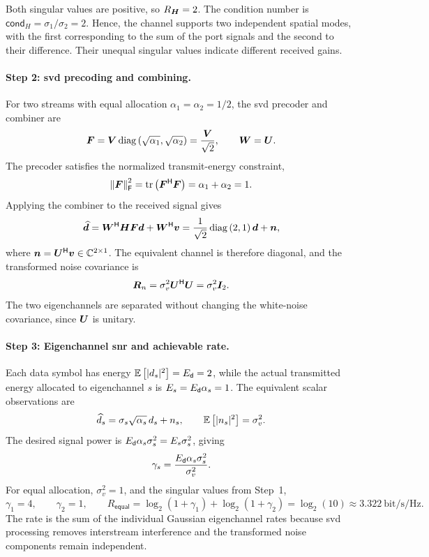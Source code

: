 Both singular values are positive, so $R_{\bm{H}}=2$. The condition number is $\mathsf{cond}_H=\sigma_1/\sigma_2=2$. Hence, the channel supports two independent spatial modes, with the first corresponding to the sum of the port signals and the second to their difference. Their unequal singular values indicate different received gains.

\paragraph{Step 2: \ac{svd} precoding and combining.}
For two streams with equal allocation $\alpha_1=\alpha_2=1/2$, the \ac{svd} precoder and combiner are
\begin{equation*}
	\bm{F}=\bm{V}\operatorname{diag}\left(\sqrt{\alpha_1},\sqrt{\alpha_2}\right)
	=\frac{\bm{V}}{\sqrt2},
	\qquad
	\bm{W}=\bm{U}.
\end{equation*}
The precoder satisfies the normalized transmit-energy constraint,
\begin{equation*}
	\left\|\bm{F}\right\|_{\mathsf{F}}^2
	=\operatorname{tr}\left({\bm{F}}^{\mathsf{H}}\bm{F}\right)
	=\alpha_1+\alpha_2=1.
\end{equation*}
Applying the combiner to the received signal gives
\begin{equation*}
	\widehat{\bm{d}}
	={\bm{W}}^{\mathsf{H}}\bm{H}\bm{F}\bm{d}+{\bm{W}}^{\mathsf{H}}\bm{v}
	=\frac1{\sqrt2}\operatorname{diag}\left(2,1\right)\bm{d}+\bm{n},
\end{equation*}
where $\bm{n}={\bm{U}}^{\mathsf{H}}\bm{v}\in\mathbb{C}^{2\times1}$. The equivalent channel is therefore diagonal, and the transformed noise covariance is
\begin{equation*}
	\bm{R}_n
	=\sigma_v^2{\bm{U}}^{\mathsf{H}}\bm{U}
	=\sigma_v^2\bm{I}_2.
\end{equation*}
The two eigenchannels are separated without changing the white-noise covariance, since $\bm{U}$ is unitary.

\paragraph{Step 3: Eigenchannel \ac{snr} and achievable rate.}
Each data symbol has energy $\mathbb{E}\left[|d_s|^2\right]=E_{\mathsf{d}}=2$, while the actual transmitted energy allocated to eigenchannel $s$ is $E_s=E_{\mathsf{d}}\alpha_s=1$. The equivalent scalar observations are
\begin{equation*}
	\widehat d_s=\sigma_s\sqrt{\alpha_s}\,d_s+n_s,
	\qquad
	\mathbb{E}\left[|n_s|^2\right]=\sigma_v^2.
\end{equation*}
The desired signal power is $E_{\mathsf{d}}\alpha_s\sigma_s^2=E_s\sigma_s^2$, giving
\begin{equation*}
	\gamma_s=\frac{E_{\mathsf{d}}\alpha_s\sigma_s^2}{\sigma_v^2}.
\end{equation*}
For equal allocation, $\sigma_v^2=1$, and the singular values from Step~1,
\begin{equation}
	\boxed{
		\gamma_1=4,\qquad
		\gamma_2=1,\qquad
		R_{\mathsf{equal}}=\log_2(1+\gamma_1)+\log_2(1+\gamma_2)
		=\log_2(10)\approx3.322\ \text{bit/s/Hz}.
	}
	\label{eq06:p2p-equal}
\end{equation}
The rate is the sum of the individual Gaussian eigenchannel rates because \ac{svd} processing removes interstream interference and the transformed noise components remain independent.

